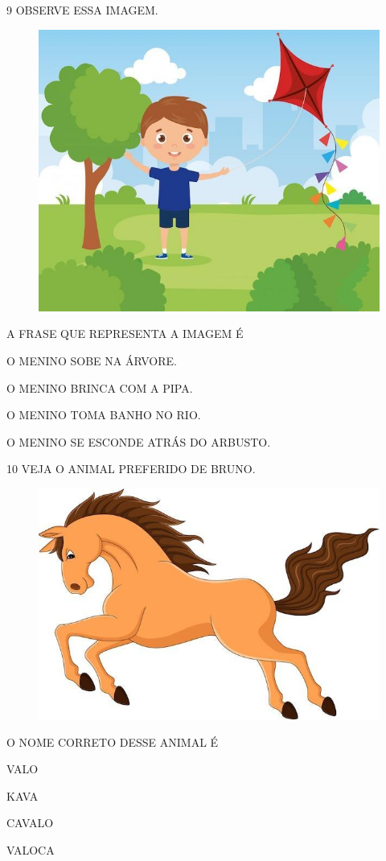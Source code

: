 \num{9} OBSERVE ESSA IMAGEM.

\begin{figure}[htpb]
\centering
\includegraphics[width=.55\textwidth]{media/image233.jpg}
\end{figure}

\pagebreak
A FRASE QUE REPRESENTA A IMAGEM É

\begin{escolha}
\item O MENINO SOBE NA ÁRVORE.

\item O MENINO BRINCA COM A PIPA.

\item O MENINO TOMA BANHO NO RIO.

\item O MENINO SE ESCONDE ATRÁS DO ARBUSTO.
\end{escolha}

\num{10} VEJA O ANIMAL PREFERIDO DE BRUNO.

\begin{figure}[htpb]
\centering
\includegraphics[width=.3\textwidth]{media/image234.jpg}
\end{figure}


O NOME CORRETO DESSE ANIMAL É

\begin{escolha}
\item VALO

\item KAVA

\item CAVALO

\item VALOCA
\end{escolha}

